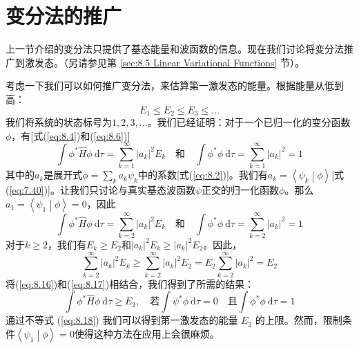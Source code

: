\section{变分法的推广}
\label{sec:8.2 Extension of the Variational Method}
    上一节介绍的变分法只提供了基态能量和波函数的信息。现在我们讨论将变分法推广到激发态。（另请参见第 \ref{sec:8.5 Linear Variational Functions} 节）。

    考虑一下我们可以如何推广变分法，来估算第一激发态的能量。根据能量从低到高：
    \begin{equation*}
        E_1 \leq E_2 \leq E_3 \leq \ldots
    \end{equation*}
    我们将系统的状态标号为$1,2,3,\ldots$。我们已经证明：对于一个已归一化的变分函数$\phi$，有[式(\ref{eq:8.4})和(\ref{eq:8.6})]
    \begin{equation*}
        \int \phi^{\ast} \hat{H}\phi \:\mathrm{d}\tau = \sum_{k=1}^{\infty} |a_k|^2 E_k \quad \text{和} \quad \int \phi^{\ast} \phi \:\mathrm{d}\tau = \sum_{k=1}^{\infty} |a_k|^2 = 1
    \end{equation*}
    其中的$a_k$是展开式$\phi = \sum_{k} a_k \psi_k$中的系数[式(\ref{eq:8.2})]。我们有$a_k = \left\langle \psi_k \middle| \phi \right\rangle$[式(\ref{eq:7.40})]。让我们只讨论与真实基态波函数$\psi$正交的归一化函数$\phi$。那么$a_1 = \left\langle \psi_1 \middle| \phi \right\rangle = 0$，因此
    \begin{equation}
        \int \phi^{\ast} \hat{H}\phi \:\mathrm{d}\tau = \sum_{k=2}^{\infty} |a_k|^2 E_k \quad \text{和} \quad \int \phi^{\ast} \phi \:\mathrm{d}\tau = \sum_{k=2}^{\infty} |a_k|^2 = 1
        \label{eq:8.16}
    \end{equation}
    对于$k \geq 2$，我们有$E_k \geq E_2$和$\left|a_k\right|^2E_k \geq \left|a_k\right|^2E_2$。因此，
    \begin{equation}
        \sum_{k=2}^{\infty} \left|a_k\right|^2 E_k \geq \sum_{k=2}^{\infty} \left|a_k\right|^2 E_2 = E_2 \sum_{k=2}^{\infty} \left|a_k\right|^2 = E_2
        \label{eq:8.17}
    \end{equation}
    将(\ref{eq:8.16})和(\ref{eq:8.17})相结合，我们得到了所需的结果：
    \begin{equation}
        \int \phi^{\ast} \hat{H}\phi \:\mathrm{d}\tau \geq E_2, \quad \text{若} \int \psi^{\ast} \phi \:\mathrm{d}\tau = 0 \quad \text{且} \int \phi^{\ast} \phi \:\mathrm{d}\tau = 1
        \label{eq:8.18}
    \end{equation}
    通过不等式 (\ref{eq:8.18}) 我们可以得到第一激发态的能量 $E_2$ 的上限。然而，限制条件$\left\langle \psi_1 \middle| \phi \right\rangle = 0$使得这种方法在应用上会很麻烦。

